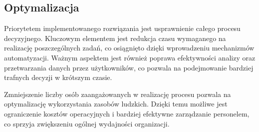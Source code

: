 \subsection{Optymalizacja}
Priorytetem implementowanego rozwiązania jest usprawnienie całego procesu decyzyjnego. Kluczowym elementem jest redukcja czasu wymaganego na realizację poszczególnych zadań, co osiągnięto dzięki wprowadzeniu mechanizmów automatyzacji. Ważnym aspektem jest również poprawa efektywności analizy oraz przetwarzania danych przez użytkowników, co pozwala na podejmowanie bardziej trafnych decyzji w krótszym czasie.

Zmniejszenie liczby osób zaangażowanych w realizację procesu pozwala na optymalizację wykorzystania zasobów ludzkich. Dzięki temu możliwe jest ograniczenie kosztów operacyjnych i bardziej efektywne zarządzanie personelem, co sprzyja zwiększeniu ogólnej wydajności organizacji.